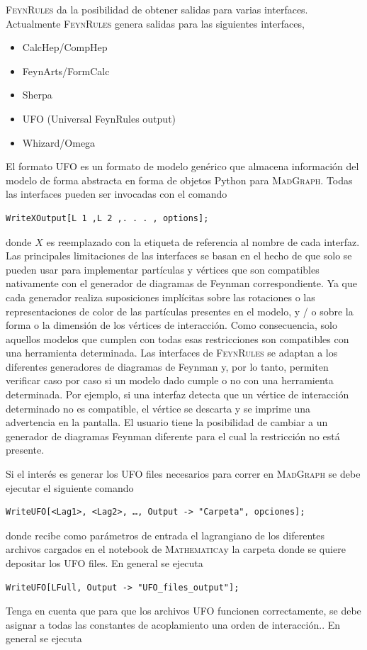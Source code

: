 \textsc{FeynRules} da la posibilidad de obtener salidas para varias interfaces. Actualmente \textsc{FeynRules} genera salidas para las siguientes interfaces,
\begin{itemize}
\item CalcHep/CompHep
\item FeynArts/FormCalc
\item Sherpa
\item UFO (Universal FeynRules output)
\item Whizard/Omega
\end{itemize}

El formato UFO es un formato de modelo genérico que almacena información del modelo de forma abstracta en forma de objetos Python para \textsc{MadGraph}. Todas las interfaces pueden ser invocadas con el comando 
%
\begin{verbatim}
WriteXOutput[L 1 ,L 2 ,. . . , options];
\end{verbatim}
%
donde $X$ es reemplazado con la etiqueta de referencia al nombre de cada interfaz. Las principales limitaciones de las interfaces se basan en el hecho de que solo se pueden usar para implementar partículas y vértices que son compatibles nativamente con el generador de diagramas de Feynman correspondiente. Ya que cada generador realiza suposiciones implícitas sobre las rotaciones o las representaciones de color de las partículas presentes en el modelo, y / o sobre la forma o la dimensión de los vértices de interacción. Como consecuencia, solo aquellos modelos que cumplen con todas esas restricciones son compatibles con una herramienta determinada. Las interfaces de \textsc{FeynRules} se adaptan a los diferentes generadores de diagramas de Feynman y, por lo tanto, permiten verificar caso por caso si un modelo dado cumple o no con una herramienta determinada. Por ejemplo, si una interfaz detecta que un vértice de interacción determinado no es compatible, el vértice se descarta y se imprime una advertencia en la pantalla. El usuario tiene la posibilidad de cambiar a un generador de diagramas Feynman diferente para el cual la restricción no está presente.

Si el interés es generar los UFO files necesarios para correr en \textsc{MadGraph} se debe ejecutar el siguiente comando
%
\begin{verbatim}
WriteUFO[<Lag1>, <Lag2>, …, Output -> "Carpeta", opciones];
\end{verbatim}
%
donde recibe como parámetros de entrada el lagrangiano de los diferentes archivos cargados en el notebook de \textsc{Mathematica}y la carpeta donde se quiere depositar los UFO files. En general se ejecuta  
%
\begin{verbatim}
WriteUFO[LFull, Output -> "UFO_files_output"];
\end{verbatim}
%
Tenga en cuenta que para que los archivos UFO funcionen correctamente, se debe asignar a todas las constantes de acoplamiento una orden de interacción.. En general se ejecuta
\newpage
